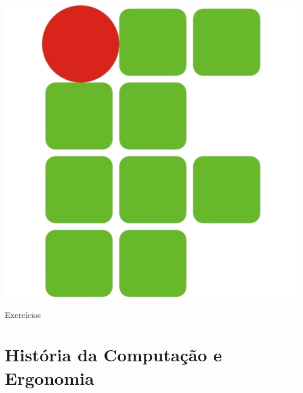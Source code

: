 \documentclass[11pt]{article}
\begin{document}
	
	\pagestyle{fancy}
	\renewcommand{\headrulewidth}{0pt}
	\renewcommand{\footrulewidth}{2.1pt}
	
	\begin{minipage}[c][1.5cm][c]{3cm}
		\begin{flushleft}
			\includegraphics[scale=0.25]{IFRN}
		\end{flushleft}
	\end{minipage}		
	\begin{minipage}[c][1.5cm][c]{10.8cm}
		\begin{center}
			\par
			\par
			\resizebox{!}{0.2cm}{\today}
		\end{center}
	\end{minipage}
	
	\begin{center}
		Exercícios
	\end{center}
	
	\section{História da Computa\c cão e Ergonomia}
	
\end{document}
